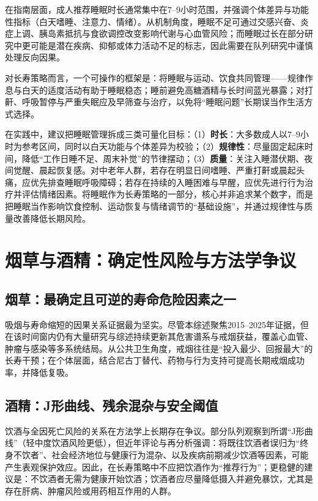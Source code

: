 \documentclass[11pt,a4paper]{article}
\begin{document}
在指南层面，成人推荐睡眠时长通常集中在7--9小时范围，并强调个体差异与功能性指标（白天嗜睡、注意力、情绪）\cite{aasm2015sleep}。从机制角度，睡眠不足可通过交感兴奋、炎症上调、胰岛素抵抗与食欲调控改变影响代谢与心血管风险；而睡眠过长在部分研究中更可能是潜在疾病、抑郁或体力活动不足的标志，因此需要在队列研究中谨慎处理反向因果。

对长寿策略而言，一个可操作的框架是：将睡眠与运动、饮食共同管理——规律作息与白天的适度活动有助于睡眠稳态；睡前避免高糖酒精与长时间蓝光暴露；对打鼾、呼吸暂停与严重失眠应及早筛查与治疗，以免将“睡眠问题”长期误当作生活方式选择。

在实践中，建议把睡眠管理拆成三类可量化目标：（1）\textbf{时长}：大多数成人以7--9小时为参考区间，同时以白天功能与个体差异为校验\cite{aasm2015sleep}；（2）\textbf{规律性}：尽量固定起床时间，降低“工作日睡不足、周末补觉”的节律摆动；（3）\textbf{质量}：关注入睡潜伏期、夜间觉醒、晨起恢复感。对中老年人群，若存在明显日间嗜睡、严重打鼾或晨起头痛，应优先排查睡眠呼吸障碍；若存在持续的入睡困难与早醒，应优先进行行为治疗并评估情绪因素。将睡眠作为长寿策略的一部分，核心并非追求某个数字，而是把睡眠当作影响饮食控制、运动恢复与情绪调节的“基础设施”，并通过规律性与质量改善降低长期风险。

\section{烟草与酒精：确定性风险与方法学争议}

\subsection{烟草：最确定且可逆的寿命危险因素之一}

吸烟与寿命缩短的因果关系证据最为坚实。尽管本综述聚焦2015--2025年证据，但在该时间窗内仍有大量研究与综述持续更新其危害谱系与戒烟获益，覆盖心血管、肿瘤与感染等多系统结局\cite{effectsoftobacco2015,theassociationof2016}。从公共卫生角度，戒烟往往是“投入最少、回报最大”的长寿干预；在个体层面，结合尼古丁替代、药物与行为支持可提高长期戒烟成功率，并降低复吸。

\subsection{酒精：J形曲线、残余混杂与安全阈值}

饮酒与全因死亡风险的关系在方法学上长期存在争议。部分队列观察到所谓“J形曲线”（轻中度饮酒风险更低），但近年评论与再分析强调：将既往饮酒者误归为“终身不饮者”、社会经济地位与健康行为混杂、以及疾病前期减少饮酒等因素，可能产生表观保护效应\cite{commentaryondi2021,alcoholconsumptionand2020}。因此，在长寿策略中不应把饮酒作为“推荐行为”；更稳健的建议是：不饮酒者无需为健康开始饮酒；饮酒者应尽量降低摄入并避免暴饮，尤其是存在肝病、肿瘤风险或用药相互作用的人群。\cite{aretherenon2022,alcoholuseand2018}
\end{document}
